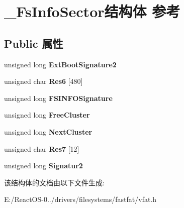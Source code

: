 \hypertarget{struct___fs_info_sector}{}\section{\+\_\+\+Fs\+Info\+Sector结构体 参考}
\label{struct___fs_info_sector}
\subsection*{Public 属性}
\begin{DoxyCompactItemize}
\item 
\mbox{\label{struct___fs_info_sector_a56de76d806b90e822e3feeb826dadb94}} 
unsigned long {\bfseries Ext\+Boot\+Signature2}
\item 
\mbox{\label{struct___fs_info_sector_a4f4f9861af1783b6235dd01c43964605}} 
unsigned char {\bfseries Res6} \mbox{[}480\mbox{]}
\item 
\mbox{\label{struct___fs_info_sector_a41187025882ded605f23d66800cf66a5}} 
unsigned long {\bfseries F\+S\+I\+N\+F\+O\+Signature}
\item 
\mbox{\label{struct___fs_info_sector_a48852eb5d461f03a6518f86f0d46219c}} 
unsigned long {\bfseries Free\+Cluster}
\item 
\mbox{\label{struct___fs_info_sector_a99898f7700ecae5b492273df8338b2f9}} 
unsigned long {\bfseries Next\+Cluster}
\item 
\mbox{\label{struct___fs_info_sector_a9ebc5716b7d3f80c09107a059a583422}} 
unsigned char {\bfseries Res7} \mbox{[}12\mbox{]}
\item 
\mbox{\label{struct___fs_info_sector_a37b496ac035913e526381d8cecfc0ad9}} 
unsigned long {\bfseries Signatur2}
\end{DoxyCompactItemize}


该结构体的文档由以下文件生成\+:\begin{DoxyCompactItemize}
\item 
E\+:/\+React\+O\+S-\/0../drivers/filesystems/fastfat/vfat.\+h\end{DoxyCompactItemize}
